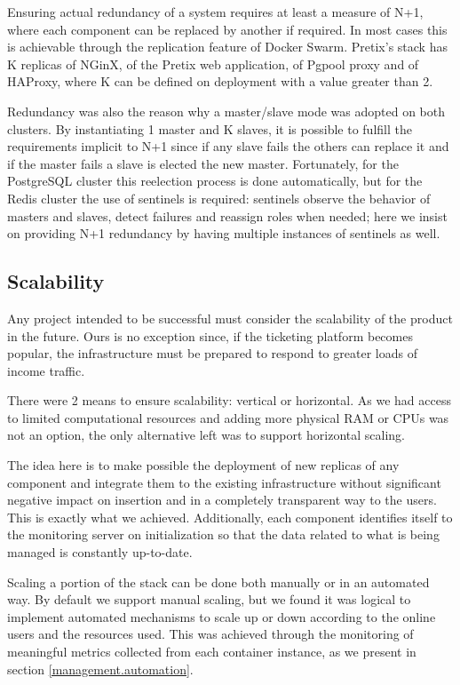 \documentclass[12pt]{article}
\begin{document}
Ensuring actual redundancy of a system requires at least a measure of N+1, where each component can be replaced by another if required.
In most cases this is achievable through the replication feature of Docker Swarm.
Pretix's stack has K replicas of NGinX, of the Pretix web application, of Pgpool proxy and of HAProxy, where K can be defined on deployment with a value greater than 2.

Redundancy was also the reason why a master/slave mode was adopted on both clusters.
By instantiating 1 master and K slaves, it is possible to fulfill the requirements implicit to N+1 since if any slave fails the others can replace it and if the
master fails a slave is elected the new master.
Fortunately, for the PostgreSQL cluster this reelection process is done automatically, but for the Redis cluster the use of sentinels is required: sentinels
observe the behavior of masters and slaves, detect failures and reassign roles when needed; here we insist on providing N+1 redundancy by having multiple
instances of sentinels as well.

\subsection{Scalability} \label{architecture.scalability} %


Any project intended to be successful must consider the scalability of the product in the future.
Ours is no exception since, if the ticketing platform becomes popular, the infrastructure must be prepared to respond to greater loads of income traffic.

There were 2 means to ensure scalability: vertical or horizontal.
As we had access to limited computational resources and adding more physical RAM or CPUs was not an option, the only alternative left was to support horizontal scaling.

The idea here is to make possible the deployment of new replicas of any component and integrate them to the existing infrastructure without significant negative
impact on insertion and in a completely transparent way to the users.
This is exactly what we achieved.
Additionally, each component identifies itself to the monitoring server on initialization so that the data related to what is being managed is constantly up-to-date.

Scaling a portion of the stack can be done both manually or in an automated way.
By default we support manual scaling, but we found it was logical to implement automated mechanisms to scale up or down according to the online users and the
resources used.
This was achieved through the monitoring of meaningful metrics collected from each container instance, as we present in section \ref{management.automation}.
\end{document}

